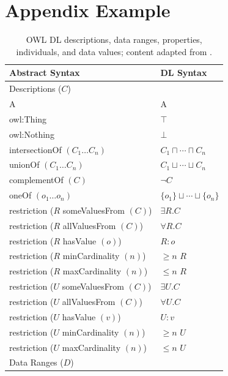 
\chapter{Appendix Example}
\label{chap:AppendixA}

\begin{table}[ht]
\centering
\renewcommand{\arraystretch}{1}
\caption{OWL DL descriptions, data ranges, properties, individuals, and data values; content adapted from \cite{Baader2003}.}
\begin{tabular}{|p{10cm}|p{5cm}|}
	\multicolumn{1}{l}{\textbf{Abstract Syntax}}
	& \multicolumn{1}{l}{\textbf{DL Syntax}}\\
			\hline
			Descriptions ($C$) & {}\\
			\hline
			A & A\\
			owl:Thing & $\top$\\
			owl:Nothing & $\bot$\\
		 \hline
			intersectionOf $(C_{1}\ldots C_{n})$ & $C_{1}\sqcap \cdots \sqcap C_{n}$ \\
			unionOf $(C_{1}\ldots C_{n})$ & $C_{1}\sqcup \cdots \sqcup C_{n}$ \\
			complementOf $(C)$ & $\neg C$\\
			oneOf $(o_{1} \ldots o_{n})$ & $\{o_{1}\} \sqcup \cdots \sqcup \{o_{n}\}$\\
			\hline
			restriction ($R$ someValuesFrom $(C)$) & $\exists R.C$ \\
			restriction ($R$ allValuesFrom $(C)$) & $\forall R.C$ \\
			restriction ($R$ hasValue $(o)$) & $R:o$ \\
			restriction ($R$ minCardinality $(n)$) & $\ge n$ $R$ \\
			restriction ($R$ maxCardinality $(n)$) & $\le n$ $R$ \\
			\hline
			restriction ($U$ someValuesFrom $(C)$) & $\exists U.C$ \\
			restriction ($U$ allValuesFrom $(C)$) & $\forall U.C$ \\
			restriction ($U$ hasValue $(v)$) & $U:v$ \\
			restriction ($U$ minCardinality $(n)$) & $\ge n$ $U$ \\
			restriction ($U$ maxCardinality $(n)$) & $\le n$ $U$ \\
			\hline
			\hline
			Data Ranges ($D$) & {}\\

\end{tabular}
\end{table}
